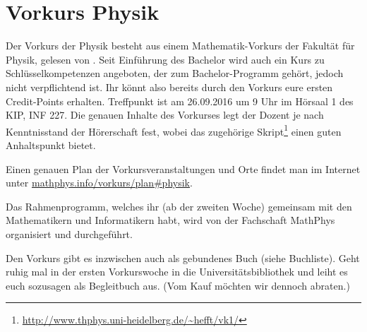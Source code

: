 \section{\Large Vorkurs Physik}
Der Vorkurs der Physik besteht aus einem Mathematik-Vorkurs der Fakultät für
Physik, gelesen von \dozentvorkurs. Seit Einführung des Bachelor wird auch ein
Kurs zu Schlüsselkompetenzen angeboten, der zum Bachelor-Programm gehört,
jedoch nicht verpflichtend ist. Ihr könnt also bereits durch den Vorkurs eure
ersten Credit-Points erhalten. Treffpunkt ist am 26.09.2016 um 9 Uhr im Hörsaal
1 des \Gls{KIP}, \Gls{INF} 227. Die genauen Inhalte des Vorkurses legt der
Dozent je nach Kenntnisstand der Hörerschaft fest, wobei das zugehörige
Skript\footnote{\url{http://www.thphys.uni-heidelberg.de/~hefft/vk1/}} einen
guten Anhaltspunkt bietet.

Einen genauen Plan der Vorkursveranstaltungen und Orte findet man im Internet
unter \url{mathphys.info/vorkurs/plan\#physik}.

Das Rahmenprogramm, welches ihr (ab der zweiten Woche) gemeinsam mit den Mathematikern und Informatikern habt, wird von der Fachschaft MathPhys organisiert und durchgeführt.%

Den Vorkurs gibt es inzwischen auch als gebundenes Buch (siehe Buchliste). Geht ruhig mal in der ersten Vorkurswoche in die Universitätsbibliothek und leiht es euch sozusagen als Begleitbuch aus. (Vom Kauf möchten wir dennoch abraten.)
